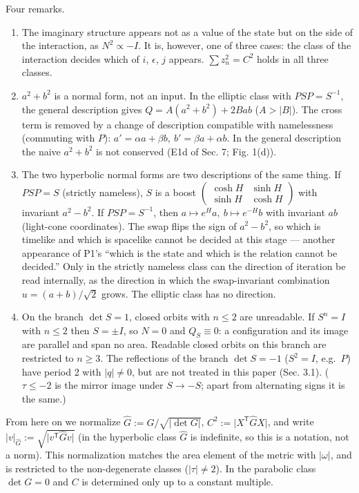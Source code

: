 \documentclass[
  a4paper,
]{article}
\begin{document}
Four remarks.

\begin{enumerate}
\def\labelenumi{(\roman{enumi})}
\item
  The imaginary structure appears not as a value of the state but on the
  side of the interaction, as \(N^2\propto-I\). It is, however, one of
  three cases: the class of the interaction decides which of \(i\),
  \(\epsilon\), \(j\) appears. \(\sum z_n^2=C^2\) holds in all three
  classes.
\item
  \(a^2+b^2\) is a normal form, not an input. In the elliptic class with
  \(PSP=S^{-1}\), the general description gives \(Q=A(a^2+b^2)+2Bab\)
  (\(A>\lvert B\rvert\)). The cross term is removed by a change of
  description compatible with namelessness (commuting with \(P\)):
  \(a'=\alpha a+\beta b,\ b'=\beta a+\alpha b\). In the general
  description the naive \(a^2+b^2\) is not conserved (E1d of Sec. 7;
  Fig. 1(d)).
\item
  The two hyperbolic normal forms are two descriptions of the same
  thing. If \(PSP=S\) (strictly nameless), \(S\) is a boost
  \(\begin{pmatrix}\cosh H&\sinh H\\\sinh H&\cosh H\end{pmatrix}\) with
  invariant \(a^2-b^2\). If \(PSP=S^{-1}\), then
  \(a\mapsto e^Ha,\ b\mapsto e^{-H}b\) with invariant \(ab\) (light-cone
  coordinates). The swap flips the sign of \(a^2-b^2\), so which is
  timelike and which is spacelike cannot be decided at this stage ---
  another appearance of P1's ``which is the state and which is the
  relation cannot be decided.'' Only in the strictly nameless class can
  the direction of iteration be read internally, as the direction in
  which the swap-invariant combination \(u=(a+b)/\sqrt2\) grows. The
  elliptic class has no direction.
\item
  On the branch \(\det S=1\), closed orbits with \(n\le2\) are
  unreadable. If \(S^n=I\) with \(n\le2\) then \(S=\pm I\), so \(N=0\)
  and \(Q_S\equiv0\): a configuration and its image are parallel and
  span no area. Readable closed orbits on this branch are restricted to
  \(n\ge3\). The reflections of the branch \(\det S=-1\) (\(S^2=I\),
  e.g.~\(P\)) have period 2 with \(\lvert q\rvert\neq0\), but are not
  treated in this paper (Sec. 3.1). (\(\tau\le-2\) is the mirror image
  under \(S\to-S\); apart from alternating signs it is the same.)
\end{enumerate}

From here on we normalize \(\hat G:=G/\sqrt{\lvert\det G\rvert}\),
\(C^2:=\lvert X^{\mathsf T}\hat GX\rvert\), and write
\(\lvert v\rvert_{\hat G}:=\sqrt{\lvert v^{\mathsf T}\hat Gv\rvert}\)
(in the hyperbolic class \(\hat G\) is indefinite, so this is a
notation, not a norm). This normalization matches the area element of
the metric with \(\lvert\omega\rvert\), and is restricted to the
non-degenerate classes (\(\lvert\tau\rvert\neq2\)). In the parabolic
class \(\det G=0\) and \(C\) is determined only up to a constant
multiple.
\end{document}
